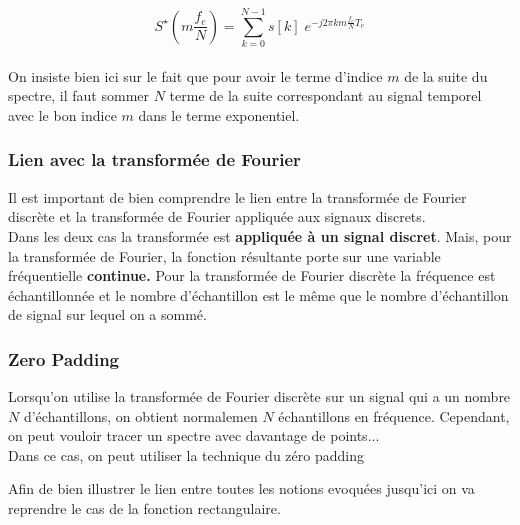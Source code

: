 \documentclass[11pt,a4paper]{article}
\begin{document}
\[S^{\star} (m \frac{f_e}{N}) = \sum_{k = 0}^{N-1} s[k] \; e^{-j 2 \pi k m \frac{f_e}{N} T_e} \]\\

On insiste bien ici sur le fait que pour avoir le terme d'indice $m$ de la suite du spectre, il faut sommer $N$ terme de la suite correspondant au signal temporel avec le bon indice $m$ dans le terme exponentiel.\\

\subsubsection{Lien avec la transformée de Fourier}
Il est important de bien comprendre le lien entre la transformée de Fourier discrète et la transformée de Fourier appliquée aux signaux discrets.\\

Dans les deux cas la transformée est \textbf{appliquée à un signal discret}. Mais, pour la transformée de Fourier, la fonction résultante porte sur une variable fréquentielle \textbf{continue.} Pour la transformée de Fourier discrète la fréquence est échantillonnée et le nombre d'échantillon est le même que le nombre d'échantillon de signal sur lequel on a sommé.\\

\subsubsection{Zero Padding}
Lorsqu'on utilise la transformée de Fourier discrète sur un signal qui a un nombre $N$ d'échantillons, on obtient normalemen $N$ échantillons en fréquence. Cependant, on peut vouloir tracer un spectre avec davantage de points...\\

Dans ce cas, on peut utiliser la technique du zéro padding 


Afin de bien illustrer le lien entre toutes les notions evoquées jusqu'ici on va reprendre le cas de la fonction rectangulaire.

\begin{center}
\end{center}
\end{document}

